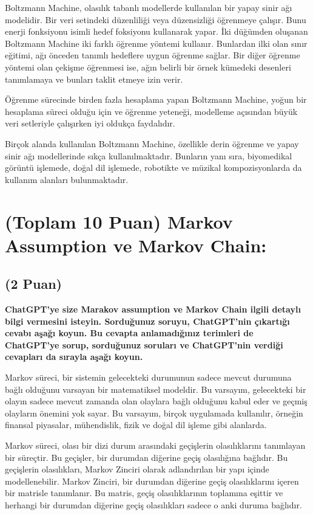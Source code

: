 \documentclass[11pt]{article}
\begin{document}
Boltzmann Machine, olasılık tabanlı modellerde kullanılan bir yapay sinir ağı modelidir. Bir veri setindeki düzenliliği veya düzensizliği öğrenmeye çalışır. Bunu enerji fonksiyonu isimli hedef foksiyonu kullanarak yapar. İki düğümden oluşanan Boltzmann Machine iki farklı öğrenme yöntemi kullanır. Bunlardan ilki olan sınır eğitimi, ağı önceden tanımlı hedeflere uygun öğrenme sağlar. Bir diğer öğrenme yöntemi olan çekişme öğrenmesi ise, ağın belirli bir örnek kümedeki desenleri tanımlamaya ve bunları taklit etmeye izin verir.

Öğrenme sürecinde birden fazla hesaplama yapan Boltzmann Machine, yoğun bir hesaplama süreci olduğu için ve öğrenme yeteneği, modelleme  açısından büyük veri setleriyle çalışırken iyi oldukça faydalıdır.

Birçok alanda kullanılan Boltzmann Machine, özellikle derin öğrenme ve yapay sinir ağı modellerinde sıkça kullanılmaktadır. Bunların yanı sıra, biyomedikal görüntü işlemede, doğal dil işlemede, robotikte ve müzikal kompozisyonlarda da kullanım alanları bulunmaktadır.



\section{(Toplam 10 Puan) Markov Assumption ve Markov Chain:}

\subsection{(2 Puan)} \textbf{ChatGPT’ye size Marakov assumption ve Markov Chain ilgili detaylı bilgi vermesini isteyin. Sorduğunuz soruyu, ChatGPT'nin çıkartığı cevabı aşağı koyun. Bu cevapta anlamadığınız terimleri de ChatGPT’ye sorup, sorduğunuz soruları ve ChatGPT’nin verdiği cevapları da sırayla aşağı koyun.}

Markov süreci, bir sistemin gelecekteki durumunun sadece mevcut durumuna bağlı olduğunu varsayan bir matematiksel modeldir. Bu varsayım, gelecekteki bir olayın sadece mevcut zamanda olan olaylara bağlı olduğunu kabul eder ve geçmiş olayların önemini yok sayar. Bu varsayım, birçok uygulamada kullanılır, örneğin finansal piyasalar, mühendislik, fizik ve doğal dil işleme gibi alanlarda.

Markov süreci, olası bir dizi durum arasındaki geçişlerin olasılıklarını tanımlayan bir süreçtir. Bu geçişler, bir durumdan diğerine geçiş olasılığına bağlıdır. Bu geçişlerin olasılıkları, Markov Zinciri olarak adlandırılan bir yapı içinde modellenebilir. Markov Zinciri, bir durumdan diğerine geçiş olasılıklarını içeren bir matrisle tanımlanır. Bu matris, geçiş olasılıklarının toplamına eşittir ve herhangi bir durumdan diğerine geçiş olasılıkları sadece o anki duruma bağlıdır.
\end{document}
